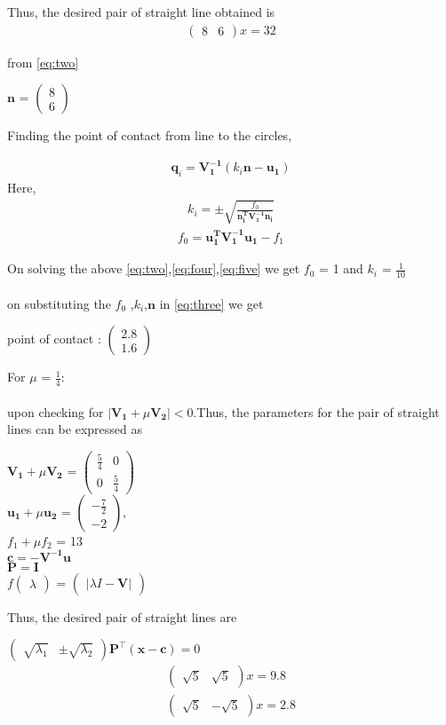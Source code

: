 \documentclass[journal,12pt,twocolumn]{IEEEtran}
\newcommand{\myvec}[1]{\ensuremath{\begin{pmatrix}#1\end{pmatrix}}}
\let\vec\mathbf
\begin{document}
Thus, the desired pair of straight line obtained is 
\begin{align}
\label{eq:two}
\myvec{8 & 6}x = 32
\end{align}

from \eqref{eq:two} \\ 
\begin{center}
$\vec{n}$ = $\myvec{8 \\ 6}$ 
\end{center}	 
Finding the point of contact from line to the circles,

\begin{align}
\label{eq:three}
\boxed{\vec{q}_i = \vec{V_1^{-1}}(k_i\vec{n-u_1})} 
\end{align}
Here, 
\begin{align}
\label{eq:four}
k_i = \pm\sqrt{\frac{f_0}{\vec{n_i^TV_1^{-1}n_i}}}
\end{align}
\begin{align}
\label{eq:five}
f_0 = \vec{u_1^TV_1^{-1}u_1}-f_1
\end{align}

On solving the above \eqref{eq:two},\eqref{eq:four},\eqref{eq:five} we get $f_0$ = 1 and $k_i$ = $\frac{1}{10}$\\ \\
on substituting the $f_0$ ,$k_i$,$\vec{n}$ in \eqref{eq:three} we get \\
\begin{center}
point of contact : $\myvec{2.8 \\ 1.6}$
\end{center}

For $\mu$ = $\frac{1}{4}$: \\ \\
upon checking for $|\vec{V_1}+\mu\vec{V_2}|<0$.Thus, the parameters for the pair of straight lines can be expressed as \\

\begin{center}
$\vec{V_1}+\mu\vec{V_2}$ = $\myvec{\frac{5}{4} & 0 \\ 0 & \frac{5}{4}}$ \\ 
$\vec{u_1}+\mu\vec{u_2}$ = $\myvec{-\frac{7}{2} \\ -2}$, \\
${f_1+\mu f_2}$ = 13 \\ 
$\vec{c} = \vec{-V^{-1}u}$ \\ 
$\vec{P} = \vec{I}$ \\
$f\myvec{\lambda}$ = $\myvec{|\lambda I - \vec{V}|}$
\end{center} 
Thus, the desired pair of straight lines are 
\begin{center}
$\myvec{\sqrt{\lambda_1} & \pm \sqrt{\lambda_2}}\vec{P}^{\top} \vec{(x-c)}=0$ 
\begin{align}
\label{eq:six}
\myvec{\sqrt{5} & \sqrt{5}}x = 9.8 \\
\label{eq:seven}
\myvec{\sqrt{5} & -\sqrt{5}}x = 2.8
\end{align}
\end{center}
\end{document}
